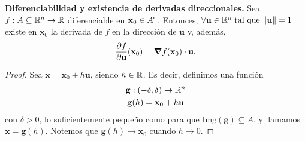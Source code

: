 \begin{theorem}\textbf{Diferenciabilidad y existencia de derivadas direccionales.}\label{teo:difDir} Sea $f: A  \subseteq  \mathbb{R}^n \to \mathbb{R}$ diferenciable en $\mathbf{x}_0 \in {\kern0ptA}^{\mathrm{o}}$. Entonces, $\forall {\mathbf{u}} \in \mathbb{R}^n\;\text{tal que } \norm{{\mathbf{u}}} = 1$ existe en $\mathbf{x}_0$ la derivada de $f$ en la direcci\'on de ${\mathbf{u}}$ y, adem\'as,
\[
 \frac{\partial f}{\partial {\mathbf{u}}} (\mathbf{x}_0) = \grad f (\mathbf{x}_0) \cdot {\mathbf{u}}.
\] \begin{proof}   Sea $\mathbf{x} = \mathbf{x}_0 + h {\mathbf{u}}$, siendo $h \in \mathbb{R}$. Es decir, definimos una funci\'on 
 \begin{gather*}
      \mathbf{g} :(-\delta,\delta) \to \mathbb{R}^n \\
      \mathbf{g}(h) = \mathbf{x}_0 + h {\mathbf{u}}
 \end{gather*}
con $\delta > 0$, lo suficientemente peque\~{n}o como para que $\text{Img}(\mathbf{g})  \subseteq  A$, y llamamos $\mathbf{x} = \mathbf{g}(h)$. Notemos que $\mathbf{g}(h) \to \mathbf{x}_0$ cuando $h \to 0$. 


\end{proof}
\end{theorem}
